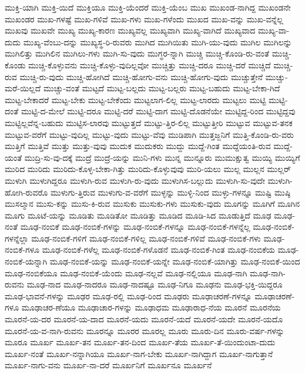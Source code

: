 {ಮುಕ್ತಿ-ಯಾಗಿ
ಮುಕ್ತಿ-ಯಿದೆ
ಮುಕ್ತಿಯೂ
ಮುಕ್ತಿ-ಯೆಂದರೆ
ಮುಕ್ತಿ-ಯೆಂಬ
ಮುಖ
ಮುಖಂಡ-ನಾಗಿದ್ದ
ಮುಖಂಡನೇ
ಮುಖಂಡರ
ಮುಖ-ಗಳಷ್ಟೆ
ಮುಖ-ಗಳಿವೆ
ಮುಖ-ಗಳು
ಮುಖ-ಗಳೆಂದು
ಮುಖದ
ಮುಖ-ವನ್ನು
ಮುಖ-ವನ್ನೆಲ್ಲ
ಮುಖವು
ಮುಖವೇ
ಮುಖ್ಯ
ಮುಖ್ಯ-ಕಾರಣ
ಮುಖ್ಯವಲ್ಲ
ಮುಖ್ಯವಾಗಿ
ಮುಖ್ಯ-ವಾಗಿದೆ
ಮುಖ್ಯವಾದ
ಮುಖ್ಯ-ವಾ-ದುದು
ಮುಖ್ಯ-ವೆಂಬು-ದನ್ನು
ಮುಖ್ಯಸ್ಥ-ರಿ-ರುವರು
ಮುಗಿದ
ಮುಗಿಯಿತು
ಮುಗಿ-ಯು-ವುದು
ಮುಗಿಲ
ಮುಗಿಲನ್ನು
ಮುಗಿಲಿತ್ತು
ಮುಗಿಲಿನ
ಮುಗಿಲು-ಗಳು
ಮುಗಿ-ಸು-ವುದು
ಮುಗ್ಧರ-ನ್ನಾಗಿ
ಮುಚ್ಚಿ
ಮುಚ್ಚಿ-ಕೊಂಡಿ-ರು-ವಂತೆ
ಮುಚ್ಚಿ-ಕೊಂಡು
ಮುಚ್ಚಿ-ಕೊಳ್ಳುವನು
ಮುಚ್ಚಿ-ಕೊಳ್ಳು-ವುದಿಲ್ಲವೋ
ಮುಚ್ಚಿತ್ತು
ಮುಚ್ಚಿ-ದರೂ
ಮುಚ್ಚಿ-ದರೆ
ಮುಚ್ಚಿದೆ
ಮುಚ್ಚಿ-ರುವ
ಮುಚ್ಚಿ-ರು-ವುದು
ಮುಚ್ಚಿ-ಹೋಗಿದೆ
ಮುಚ್ಚಿ-ಹೋಗು-ವನು
ಮುಚ್ಚಿ-ಹೋಗು-ವುದು
ಮುಚ್ಚುತ್ತೇನೆ
ಮುಚ್ಚು-ಮರೆ-ಯಿಲ್ಲದೆ
ಮುಚ್ಚು-ವಂತೆ
ಮುಟ್ಟದೆ
ಮುಟ್ಟ-ಬಲ್ಲದು
ಮುಟ್ಟ-ಬಲ್ಲರು
ಮುಟ್ಟ-ಬಹುದು
ಮುಟ್ಟ-ಬೇಕಾ-ಗಿದೆ
ಮುಟ್ಟ-ಬೇಕಾದರೆ
ಮುಟ್ಟ-ಬೇಕು
ಮುಟ್ಟ-ಬೇಕೆಂದು
ಮುಟ್ಟಲಾಗ-ಲಿಲ್ಲ
ಮುಟ್ಟ-ಲಾರದು
ಮುಟ್ಟಲು
ಮುಟ್ಟಿ
ಮುಟ್ಟಿ-ದಂತೆ
ಮುಟ್ಟಿ-ದ-ಮೇಲೆ
ಮುಟ್ಟಿ-ದರೂ
ಮುಟ್ಟಿ-ದರೆ
ಮುಟ್ಟಿ-ದಾಗ
ಮುಟ್ಟಿ-ದೊಡನೆಯೇ
ಮುಟ್ಟಿದ್ದ-ರಿಂದ
ಮುಟ್ಟಿದ್ದವು
ಮುಟ್ಟಿಲ್ಲವೆನ್ನ-ಬಹುದು
ಮುಟ್ಟಿಸ-ಲಾರವು
ಮುಟ್ಟುತ್ತದೆ
ಮುಟ್ಟು-ತ್ತಿರ-ಲಿಲ್ಲ
ಮುಟ್ಟುತ್ತೀರಿ
ಮುಟ್ಟುವ
ಮುಟ್ಟುವ-ತನಕ
ಮುಟ್ಟುವ-ವರೆಗೆ
ಮುಟ್ಟು-ವುದಿಲ್ಲ
ಮುಟ್ಟು-ವುದು
ಮುಟ್ಟು-ವೆವು
ಮುಡಿಪಾಗಿ
ಮುತ್ತಜ್ಜನಿಗೆ
ಮುತ್ತಿ-ಕೊಂಡಿ-ರು-ವರು
ಮುತ್ತಿಗೆ
ಮುತ್ತಿವೆ
ಮುತ್ತು
ಮುತ್ತು-ವುವು
ಮುದುಕ
ಮುದುಕರು
ಮುದ್ದು
ಮುದ್ದೆ-ಗಿಂತ
ಮುದ್ದೆಯಂತಿ-ರುವ
ಮುದ್ದೆ-ಯಂತೆ
ಮುದ್ರಿ-ಸು-ವು-ದಕ್ಕೆ
ಮುದ್ರೆ
ಮುದ್ರೆ-ಯನ್ನು
ಮುನಿ-ಗಳು
ಮುನ್ನ
ಮುನ್ನೂರು
ಮುಮುಕ್ಷುತ್ವ
ಮುಯ್ಯಿ
ಮುಯ್ಯಿಗೆ
ಮುರಿದ
ಮುರಿದು
ಮುರಿದು-ಕೊಳ್ಳ-ಬೇಕಾ-ಗಿತ್ತು
ಮುರಿದು-ಕೊಳ್ಳುವುವು
ಮುರಿ-ಯಲು
ಮುಲ್ಲ
ಮುಲ್ಲನ
ಮುಲ್ಲರ್
ಮುಳುಗಿ
ಮುಳುಗಿದ್ದರೂ
ಮುಳುಗಿ-ರುವ
ಮುಳುಗಿ-ರು-ವುದು
ಮುಳುಗಿಸ-ಬಲ್ಲುದು
ಮುಳುಗಿ-ಸು-ವುದೇ
ಮುಳುಗಿ-ಹೋಗಿ-ರುವರೊ
ಮುಳುಗು-ತ್ತಿರುವ
ಮುಳುಗು-ವ-ವರೆಗೆ
ಮುಳ್ಳನ್ನು
ಮುಳ್ಳಿ-ನಿಂದ
ಮುಳ್ಳು-ಗಳನ್ನೂ
ಮುಷ್ಟಿ
ಮುಷ್ಠಿ
ಮುಸಲ್ಮಾನ
ಮುಸು-ಕನ್ನು
ಮುಸು-ಕಿ-ರುವ
ಮುಸುಕು
ಮುಸುಕು-ಗಳು
ಮುಸುಕು-ವುದು
ಮೂಗನ್ನು
ಮೂಗಿಗೆ
ಮೂಗಿನ
ಮೂಗು
ಮೂಟೆ-ಯನ್ನು
ಮೂಡಿತು
ಮೂಡಿತೋ
ಮೂಡಿತ್ತು
ಮೂಡಿದ
ಮೂಡಿ-ಸಿದ
ಮೂಡುತ್ತಿದೆ
ಮೂಢ
ಮೂಢ-ನಂತೆ
ಮೂಢ-ನಂಬಿಕೆ
ಮೂಢ-ನಂಬಿಕೆ-ಗಳನ್ನು
ಮೂಢ-ನಂಬಿಕೆ-ಗಳನ್ನೂ
ಮೂಢ-ನಂಬಿಕೆ-ಗಳನ್ನೆಲ್ಲ
ಮೂಢ-ನಂಬಿಕೆ-ಗಳನ್ನೆಲ್ಲಾ
ಮೂಢ-ನಂಬಿಕೆ-ಗಳಿಗೆ
ಮೂಢ-ನಂಬಿಕೆ-ಗಳಿಲ್ಲ
ಮೂಢ-ನಂಬಿಕೆ-ಗಳಿವೆ
ಮೂಢ-ನಂಬಿಕೆ-ಗಳು
ಮೂಢ-ನಂಬಿಕೆ-ಗಳೂ
ಮೂಢ-ನಂಬಿಕೆ-ಗಳೆಲ್ಲ
ಮೂಢ-ನಂಬಿಕೆ-ಗಳೊಡನೆ
ಮೂಢ-ನಂಬಿಕೆ-ಗಿಂತ
ಮೂಢ-ನಂಬಿಕೆಯ
ಮೂಢ-ನಂಬಿಕೆ-ಯನ್ನಾಗಿ
ಮೂಢ-ನಂಬಿಕೆ-ಯನ್ನು
ಮೂಢ-ನಂಬಿಕೆ-ಯನ್ನೇ
ಮೂಢ-ನಂಬಿಕೆ-ಯಾಗಿತ್ತು
ಮೂಢ-ನಂಬಿಕೆ-ಯಿಂದ
ಮೂಢ-ನಂಬಿಕೆಯೂ
ಮೂಢ-ನಂಬಿಕೆ-ಯೆಂದು
ಮೂಢ-ನಲ್ಲವೆ
ಮೂಢ-ನಲ್ಲಿಯೂ
ಮೂಢ-ನಾಗಿ
ಮೂಢ-ನಾಗಿ-ರುವನು
ಮೂಢ-ನಾದ
ಮೂಢ-ನಾದರೂ
ಮೂಢ-ನಾದಷ್ಟೂ
ಮೂಢ-ನಿಗೂ
ಮೂಢನು
ಮೂಢ-ಭಕ್ತಿ-ಯಿದ್ದರೂ
ಮೂಢ-ಭಾವನೆ-ಗಳನ್ನು
ಮೂಢರ
ಮೂಢ-ರಲ್ಲಿ
ಮೂಢ-ರಿಂದ
ಮೂಢರು
ಮೂಢಾಚರಣೆ-ಗಳನ್ನೂ
ಮೂಢಾಚರಣೆ-ಗಳೂ
ಮೂಢಾಚರ-ಣೆಯೂ
ಮೂಢಾಚಾರ-ಗಳನ್ನು
ಮೂಢಾಧಮ
ಮೂಢಾರಾಧ-ನೆಯ
ಮೂರನೆ
ಮೂರನೆಯ
ಮೂರನೆ-ಯ-ದರ
ಮೂರನೆ-ಯ-ದಾದ
ಮೂರನೆ-ಯದು
ಮೂರನೆ-ಯದೆ
ಮೂರನೆ-ಯದೇ
ಮೂರನೆ-ಯದೊ
ಮೂರನೆ-ಯ-ವ-ನಾಗಿ-ರುವನು
ಮೂರನ್ನೂ
ಮೂರರ
ಮೂರಲ್ಲ
ಮೂರು
ಮೂರು-ದಿನ
ಮೂರು-ವರ್ಷ-ಗಳನ್ನು
ಮೂರೂ
ಮೂರ್ಖ
ಮೂರ್ಖ-ತನ
ಮೂರ್ಖ-ತನ-ದಿಂದ
ಮೂರ್ಖ-ತೆಯ
ಮೂರ್ಖ-ತೆ-ಯಿಂದುಂಟಾ-ದುದು
ಮೂರ್ಖ-ನಂತೆ
ಮೂರ್ಖ-ನನ್ನಾಗಿಯೂ
ಮೂರ್ಖ-ನಾಗ-ಬೇಕು
ಮೂರ್ಖ-ನಾಗಿದ್ದಾಗ
ಮೂರ್ಖ-ನಾಗುತ್ತಾನೆ
ಮೂರ್ಖ-ನಾಗು-ವನು
ಮೂರ್ಖ-ನಾ-ದರೆ
ಮೂರ್ಖನಿಗೆ
ಮೂರ್ಖನೂ
ಮೂರ್ಖನೆ
}
